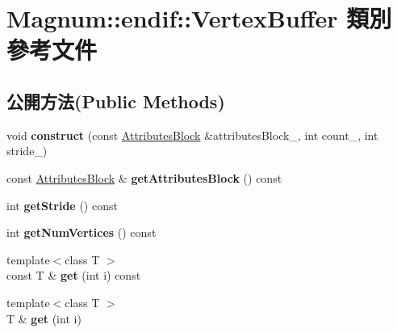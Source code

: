 \hypertarget{class_magnum_1_1endif_1_1_vertex_buffer}{}\section{Magnum\+:\+:endif\+:\+:Vertex\+Buffer 類別 參考文件}
\label{class_magnum_1_1endif_1_1_vertex_buffer}
\subsection*{公開方法(Public Methods)}
\begin{DoxyCompactItemize}
\item 
void {\bfseries construct} (const \hyperlink{class_magnum_1_1_attributes_block}{Attributes\+Block} \&attributes\+Block\+\_\+, int count\+\_\+, int stride\+\_\+)\hypertarget{class_magnum_1_1endif_1_1_vertex_buffer_ad55ccd3143b73f35b0cd115c6fae7b1b}{}\label{class_magnum_1_1endif_1_1_vertex_buffer_ad55ccd3143b73f35b0cd115c6fae7b1b}

\item 
const \hyperlink{class_magnum_1_1_attributes_block}{Attributes\+Block} \& {\bfseries get\+Attributes\+Block} () const \hypertarget{class_magnum_1_1endif_1_1_vertex_buffer_ad288aa1c58b81a09845835804a4877a9}{}\label{class_magnum_1_1endif_1_1_vertex_buffer_ad288aa1c58b81a09845835804a4877a9}

\item 
int {\bfseries get\+Stride} () const \hypertarget{class_magnum_1_1endif_1_1_vertex_buffer_aa462011fe5c7b673b15e2e00976e9931}{}\label{class_magnum_1_1endif_1_1_vertex_buffer_aa462011fe5c7b673b15e2e00976e9931}

\item 
int {\bfseries get\+Num\+Vertices} () const \hypertarget{class_magnum_1_1endif_1_1_vertex_buffer_ae9fb21350de7904612b611e798e11fe1}{}\label{class_magnum_1_1endif_1_1_vertex_buffer_ae9fb21350de7904612b611e798e11fe1}

\item 
{\footnotesize template$<$class T $>$ }\\const T \& {\bfseries get} (int i) const \hypertarget{class_magnum_1_1endif_1_1_vertex_buffer_aab40dfb8fb51bb0159d02650357ae77c}{}\label{class_magnum_1_1endif_1_1_vertex_buffer_aab40dfb8fb51bb0159d02650357ae77c}

\item 
{\footnotesize template$<$class T $>$ }\\T \& {\bfseries get} (int i)\hypertarget{class_magnum_1_1endif_1_1_vertex_buffer_ac83db17f60e304653142dc186d895244}{}\label{class_magnum_1_1endif_1_1_vertex_buffer_ac83db17f60e304653142dc186d895244}


\end{DoxyCompactItemize}
